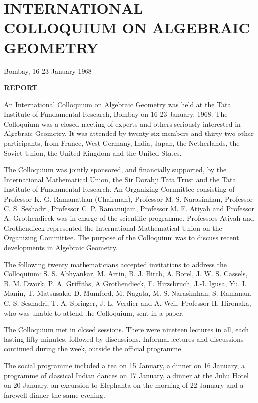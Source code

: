 \chapter[Report]{INTERNATIONAL COLLOQUIUM ON ALGEBRAIC GEOMETRY}

\begin{center}
Bombay, 16-23 January 1968
\end{center}

\setcounter{page}{4}

\bigskip

\begin{center}
{\LARGE\bf REPORT}
\end{center}


An International Colloquium on Algebraic Geometry was held at the Tata Institute of Fundamental Research, Bombay on 16-23 January, 1968. The Colloquium was a closed meeting of experts and others seriously interested in Algebraic Geometry. It was attended by twenty-six members and thirty-two other participants, from France, West Germany, India, Japan, the Netherlands, the Soviet Union, the United Kingdom and the United States.

The Colloquium was jointly sponsored, and financially supported, by the International Mathematical Union, the Sir Dorabji Tata Trust and the Tata Institute of Fundamental Research. An Organizing Committee consisting of Professor K. G. Ramanathan (Chairman), Professor M. S. Narasimhan, Professor C. S. Seshadri, Professor C. P. Ramanujam, Professor M. F. Atiyah and Professor A. Grothendieck was in charge of the scientific programme. Professors Atiyah and Grothendieck represented the International Mathematical Union on the Organizing Committee. The purpose of the Colloquium was to discuss recent developments in Algebraic Geometry.

The following twenty mathematicians accepted invitations to address the Colloquium: S. S. Abhyankar, M. Artin, B. J. Birch, A. Borel, J. W. S. Cassels, B. M. Dwork, P. A. Griffiths, A Grothendieck, F. Hirzebruch, J.-I. Igusa, Yu. I. Manin, T. Matsusaka, D. Mumford, M. Nagata, M. S. Narasimhan, S. Ramanan, C. S. Seshadri, T. A. Springer, J. L. Verdier and A. Weil. Professor H. Hironaka, who was unable to attend the Colloquium, sent in a paper.

The Colloquium met in closed sessions. There were nineteen lectures in all, each lasting fifty minutes, followed by discussions. Informal lectures and discussions continued during the week, outside the official programme.

The social programme included a tea on 15 January, a dinner on 16 January, a programme of classical Indian dances on 17 January, a dinner at the Juhu Hotel on 20 January, an excursion to Elephanta  on the morning of 22 January and a farewell dinner the same evening.

 

